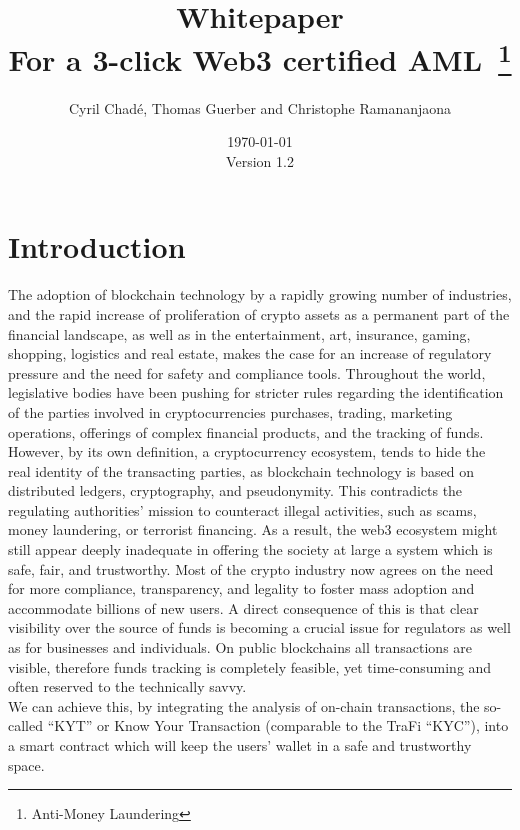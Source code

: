 ﻿\documentclass[a4paper]{article}
\newcommand{\version}{\vspace{10pt}\\ Version 1.2}
\begin{document}
\title{Whitepaper \vspace{10pt} \\
\large For a 3-click Web3 certified AML~\footnote{Anti-Money Laundering}}
\author{Cyril Chad\'e, Thomas Guerber and Christophe Ramananjaona}
\date{\today\version}
\maketitle
\thispagestyle{fancy}
\tableofcontents
\newpage
\section{Introduction}

The adoption of blockchain technology by a rapidly growing number of industries, and the rapid increase of proliferation of crypto assets as a permanent part of the financial landscape, as well as in the entertainment, art, insurance, gaming, shopping, logistics and real estate, makes the case for an increase of regulatory pressure and the need for safety and compliance tools. Throughout the world, legislative bodies have been pushing for stricter rules regarding the identification of the parties involved in cryptocurrencies purchases, trading, marketing operations, offerings of complex financial products, and the tracking of funds.
However, by its own definition, a cryptocurrency ecosystem, tends to hide the real identity of the transacting parties, as blockchain technology is based on distributed ledgers, cryptography, and pseudonymity. This contradicts the regulating authorities’ mission to counteract illegal activities, such as scams, money laundering, or terrorist financing. As a result, the web3 ecosystem might still appear deeply inadequate in offering the society at large a system which is safe, fair, and trustworthy. 
Most of the crypto industry now agrees on the need for more compliance, transparency, and legality to foster mass adoption and accommodate billions of new users. A direct consequence of this is that clear visibility over the source of funds is becoming a crucial issue for regulators as well as for businesses and individuals. On public blockchains all transactions are visible, therefore funds tracking is completely feasible, yet time-consuming and often reserved to the technically savvy. \\

We can achieve this, by integrating the analysis of on-chain transactions, the so-called “KYT” or Know Your Transaction (comparable to the TraFi “KYC”), into a smart contract which will keep the users’ wallet in a safe and trustworthy space. \\
\end{document}
